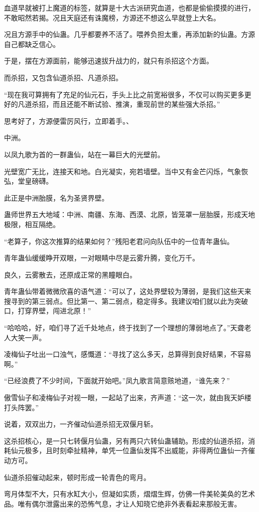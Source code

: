 \begin{this_body}
血道早就被打上魔道的标签，就算是十大古派研究血道，也都是偷偷摸摸的进行，不敢昭然若揭。况且天庭还有诛魔榜，方源还不想这么早就登上大名。

况且方源手中的仙蛊。几乎都要养不活了。喂养负担太重，再添加新的仙蛊。方源自己都缺乏信心。

于是，摆在方源面前，能够迅速拔升战力的，就只有杀招这个方面。

而杀招，又包含仙道杀招、凡道杀招。

“现在我可算拥有了充足的仙元石，手头上比之前宽裕很多，不仅可以购买更多更好的凡道杀招，而且还能不断试验、推演，重现前世的某些强大杀招。”

思考好了，方源便雷厉风行，立即着手。、

中洲。

以凤九歌为首的一群蛊仙，站在一幕巨大的光壁前。

光壁宽广无比，连接天和地。白光凝实，宛若墙壁。当中又有金芒闪烁，气象恢弘，堂皇磅礴。

此正是中洲胎膜，名为圣贤界壁。

蛊师世界五大地域：中洲、南疆、东海、西漠、北原，皆笼罩一层胎膜，形成天地极限，相互隔绝。

“老算子，你这次推算的结果如何？”残阳老君问向队伍中的一位青年蛊仙。

青年蛊仙缓缓睁开双眼，一对眼睛中尽是云雾升腾，变化万千。

良久，云雾散去，还原成正常的黑瞳眼白。

青年蛊仙带着微微欣喜的语气道：“可以了，这处界壁较为薄弱，是我们这些天来搜寻到的第三弱点。但比第一、第二弱点，稳定得多。我建议咱们就以此为突破口，打穿界壁，闯进北原！”

“哈哈哈，好，咱们寻了近千处地点，终于找到了一个理想的薄弱地点了。”天聋老人大笑一声。

凌梅仙子吐出一口浊气，感慨道：“寻找了这么多天，总算得到良好结果，不容易啊。”

“已经浪费了不少时间，下面就开始吧。”凤九歌言简意赅地道，“谁先来？”

傲雪仙子和凌梅仙子对视一眼，一起站了出来，齐声道：“这一次，就由我天妒楼打头阵罢。”

说着，双双出力，一齐催动仙道杀招无双偃月斩。

这杀招核心，是一只七转偃月仙蛊，另有两只六转仙蛊辅助。形成的仙道杀招，消耗仙元极多，且时刻牵扯精神，单凭一位蛊仙发挥不出威能，非得两位蛊仙一齐催动方可。

仙道杀招催动起来，顿时形成一轮青色的弯月。

弯月体型不大，只有水缸大小，但凝如实质，熠熠生辉，仿佛一件美轮美奂的艺术品。唯有偶尔泄露出来的恐怖气息，才让人知晓它绝非外表看起来那般无害。


\end{this_body}
